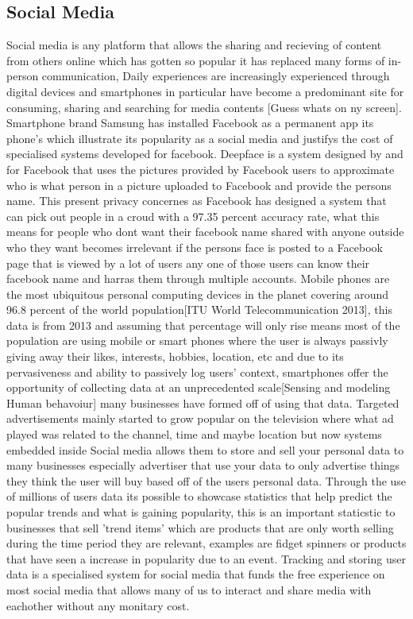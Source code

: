 \documentclass[12pt, times new roman]{article}
\begin{document}
\subsection{Social Media}
Social media is any platform that allows the sharing and recieving of content from others online which has gotten so popular it has replaced many forms of in-person communication, Daily experiences are increasingly experienced through digital devices and smartphones in particular have become a predominant site for consuming, sharing and searching for media contents [Guess whats on ny screen]. Smartphone brand Samsung has installed Facebook as a permanent  app its phone's which illustrate its popularity as a social media and justifys the cost of specialised systems developed for facebook. Deepface is a system designed by and for Facebook that uses the pictures provided by Facebook users to approximate who is what person in a picture uploaded to Facebook and provide the persons name. This present privacy concernes as Facebook has designed a system that can pick out people in a croud with a 97.35 percent accuracy rate, what this means for people who dont want their facebook name shared with anyone outside who they want becomes irrelevant if the persons face is posted to a Facebook page that is viewed by a lot of users any one of those users can know their facebook name and harras them through multiple accounts.\newline 
Mobile phones are the most ubiquitous personal computing devices in the planet covering around 96.8 percent of the world population[ITU World Telecommunication 2013], this data is from 2013 and assuming that percentage will only rise means most of the population are using mobile or smart phones where the user is always passivly giving away their likes, interests, hobbies, location, etc and due to its pervasiveness and ability to passively log users’ context, smartphones offer the opportunity of collecting data at an unprecedented scale[Sensing and modeling Human behavoiur] many businesses have formed off of using that data. Targeted advertisements mainly started to grow popular on the television where what ad played was related to the channel, time and maybe location but now systems embedded inside Social media allows them to store and sell your personal data to many businesses especially advertiser that use your data to only advertise things they think the user will buy based off of the users personal data. Through the use of millions of users data its possible to showcase statistics that help predict the popular trends and what is gaining popularity, this is an important staticstic to businesses that sell 'trend items' which are products that are only worth selling during the time period they are relevant, examples are fidget spinners or products that have seen a increase in popularity due to an event. Tracking and storing user data is a specialised system for social media that funds the free experience on most social media that allows many of us to interact and share media with eachother without any monitary cost.
\newline
\end{document}
